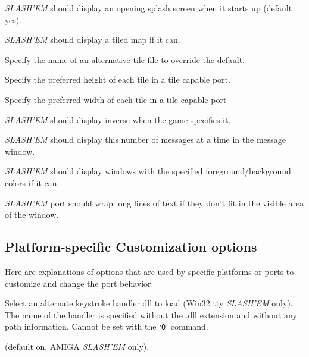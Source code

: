 \item[\ib{splash\_screen}]
{\it SLASH'EM\/} should display an opening splash screen when it starts up (default yes).

\item[\ib{tiled\_map	}]
{\it SLASH'EM\/} should display a tiled map if it can.

\item[\ib{tile\_file}]
Specify the name of an alternative tile file to override the default.

\item[\ib{tile\_height}]
Specify the preferred height of each tile in a tile capable port.

\item[\ib{tile\_width}]
Specify the preferred width of each tile in a tile capable port

\item[\ib{use\_inverse}]
{\it SLASH'EM\/} should display inverse when the game specifies it.

\item[\ib{vary\_msgcount}]
{\it SLASH'EM\/} should display this number of messages at a time in
the message window.

\item[\ib{windowcolors}]
{\it SLASH'EM\/} should display windows with the specified foreground/background
colors if it can.

\item[\ib{wraptext}]
{\it SLASH'EM\/} port should wrap long lines of text if they don't fit in 
the visible area of the window.
\elist
\nd %
\subsection*{Platform-specific Customization options}


Here are explanations of options that are used by specific platforms or ports 
to customize and change the port behavior.
\blist{}

\item[\ib{altkeyhandler}]
Select an alternate keystroke handler dll to load (Win32 tty {\it SLASH'EM\/} only).
The name of the handler is specified without the .dll extension and without any
path information.
Cannot be set with the `{\tt O}' command.

\item[\ib{altmeta}]
(default on, AMIGA {\it SLASH'EM\/} only).

